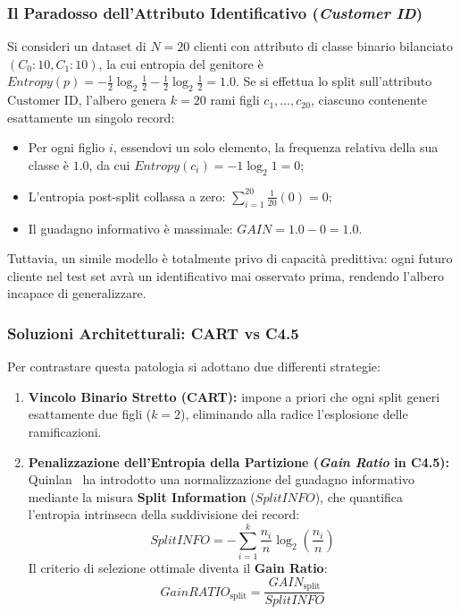 \subsubsection{Il Paradosso dell'Attributo Identificativo (\textit{Customer ID})}
Si consideri un dataset di $N = 20$ clienti con attributo di classe binario bilanciato $(C_0: 10, C_1: 10)$, la cui entropia del genitore è $Entropy(p) = -\frac{1}{2}\log_2\frac{1}{2} - \frac{1}{2}\log_2\frac{1}{2} = 1.0$.
Se si effettua lo split sull'attributo $\text{Customer ID}$, l'albero genera $k = 20$ rami figli $c_1, \dots, c_{20}$, ciascuno contenente esattamente un singolo record:
\begin{itemize}
    \item Per ogni figlio $i$, essendovi un solo elemento, la frequenza relativa della sua classe è $1.0$, da cui $Entropy(c_i) = -1 \log_2 1 = 0$;
    \item L'entropia post-split collassa a zero: $\sum_{i=1}^{20} \frac{1}{20}(0) = 0$;
    \item Il guadagno informativo è massimale: $GAIN = 1.0 - 0 = 1.0$.
\end{itemize}
Tuttavia, un simile modello è totalmente privo di capacità predittiva: ogni futuro cliente nel test set avrà un identificativo mai osservato prima, rendendo l'albero incapace di generalizzare.

\subsubsection{Soluzioni Architetturali: CART vs C4.5}
Per contrastare questa patologia si adottano due differenti strategie:
\begin{enumerate}
    \item \textbf{Vincolo Binario Stretto (CART):} impone a priori che ogni split generi esattamente due figli ($k=2$), eliminando alla radice l'esplosione delle ramificazioni.
    \item \textbf{Penalizzazione dell'Entropia della Partizione (\textit{Gain Ratio} in C4.5):} Quinlan~\cite{quinlan1993} ha introdotto una normalizzazione del guadagno informativo mediante la misura \textbf{Split Information} ($SplitINFO$), che quantifica l'entropia intrinseca della suddivisione dei record:
    \begin{equation}
        SplitINFO = -\sum_{i=1}^k \frac{n_i}{n} \log_2\left(\frac{n_i}{n}\right)
    \end{equation}
    Il criterio di selezione ottimale diventa il \textbf{Gain Ratio}:
    \begin{equation}
        GainRATIO_{\text{split}} = \frac{GAIN_{\text{split}}}{SplitINFO}
    \end{equation}
\end{enumerate}

